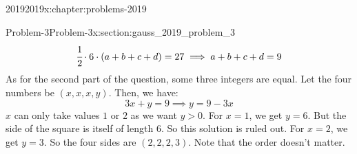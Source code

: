\documentclass[oneside,10pt,]{book}
\numberwithin{equation}{section}
\begin{document}
\begin{chapterptx}{2019}{}{2019}{}{}{x:chapter:problems-2019}
\begin{sectionptx}{Problem-3}{}{Problem-3}{}{}{x:section:gauss_2019_problem_3}
\begin{equation*}
\cfrac{1}{2} \cdot 6 \cdot (a + b + c + d) = 27 \implies a + b + c + d = 9
\end{equation*}
As for the second part of the question, some three integers are equal. Let the four numbers be \((x, x, x, y)\). Then, we have:%
\begin{equation*}
3x + y = 9 \implies y = 9 - 3x
\end{equation*}
\(x\) can only take values \(1\) or \(2\) as we want \(y > 0\). For \(x = 1\), we get \(y = 6\). But the side of the square is itself of length \(6\). So this solution is ruled out. For \(x = 2\), we get \(y = 3\). So the four sides are \((2, 2, 2, 3)\). Note that the order doesn't matter.%
\end{sectionptx}
\end{chapterptx}
\end{document}

